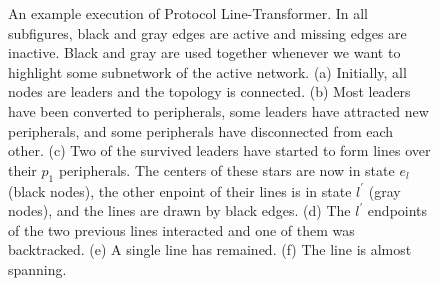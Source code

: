 \documentclass[preprint]{elsarticle}
\begin{document}
\begin{figure}[!hbtp]
   \caption{An example execution of Protocol Line-Transformer. In all subfigures, black and gray edges are active and missing edges are inactive. Black and gray are used together whenever we want to highlight some subnetwork of the active network. (a) Initially, all nodes are leaders and the topology is connected. (b) Most leaders have been converted to peripherals, some leaders have attracted new peripherals, and some peripherals have disconnected from each other. (c) Two of the survived leaders have started to form lines over their $p_1$ peripherals. The centers of these stars are now in state $e_l$ (black nodes), the other enpoint of their lines is in state $l^\prime$ (gray nodes), and the lines are drawn by black edges. (d) The $l^\prime$ endpoints of the two previous lines interacted and one of them was backtracked. (e) A single line has remained. (f) The line is almost spanning.} \label{fig:line-transformer}
\end{figure}
\end{document}
